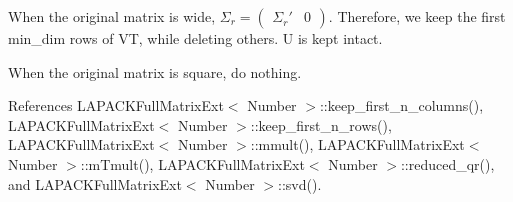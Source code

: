 When the original matrix is wide, $\Sigma_r = \begin{pmatrix} \Sigma_r' & 0 \end{pmatrix}$. Therefore, we keep the first {\ttfamily min\+\_\+dim} rows of {\ttfamily VT}, while deleting others. {\ttfamily U} is kept intact.

When the original matrix is square, do nothing.

References L\+A\+P\+A\+C\+K\+Full\+Matrix\+Ext$<$ Number $>$\+::keep\+\_\+first\+\_\+n\+\_\+columns(), L\+A\+P\+A\+C\+K\+Full\+Matrix\+Ext$<$ Number $>$\+::keep\+\_\+first\+\_\+n\+\_\+rows(), L\+A\+P\+A\+C\+K\+Full\+Matrix\+Ext$<$ Number $>$\+::mmult(), L\+A\+P\+A\+C\+K\+Full\+Matrix\+Ext$<$ Number $>$\+::m\+Tmult(), L\+A\+P\+A\+C\+K\+Full\+Matrix\+Ext$<$ Number $>$\+::reduced\+\_\+qr(), and L\+A\+P\+A\+C\+K\+Full\+Matrix\+Ext$<$ Number $>$\+::svd().

\mbox{\label{classLAPACKFullMatrixExt_a4107b8340a75683fd59024e20631ce10}} 
